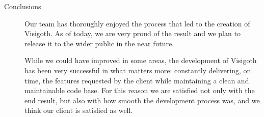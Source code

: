 \documentclass[a4paper,11pt]{article}
\begin{document}
\begin{description}
\item[Conclusions]

  Our team has thoroughly enjoyed the process that led to the creation
  of Visigoth. As of today, we are very proud of the result and we plan to
  release it to the wider public in the near future.

  While we could have improved in some areas, the development of
  Visigoth has been very successful in what matters more: constantly
  delivering, on time, the features requested by the client while
  maintaining a clean and maintainable code base.
  For this reason we are satisfied not only with the end
  result, but also with how smooth the development process was, and we
  think our client is satisfied as well.

\end{description}
\end{document}
